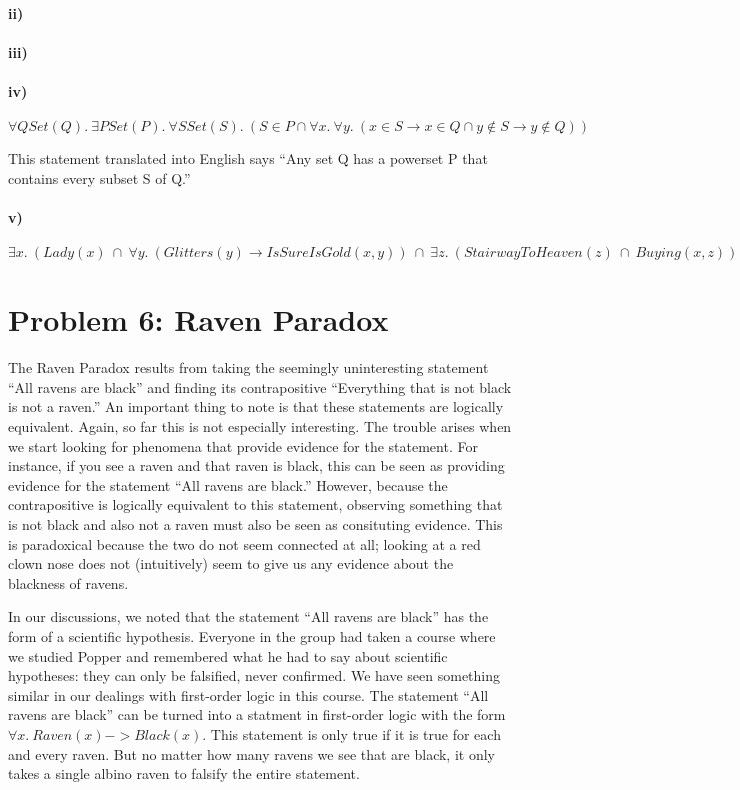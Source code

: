 \documentclass[10pt,letter]{article}
\begin{document}
\paragraph{ii)}

\paragraph{iii)}

\paragraph{iv)}
$\forall Q Set(Q) .\ \exists P Set(P) .\ \forall S Set(S) .\ (S \in P \cap \forall x .\ \forall y .\ (x \in S \rightarrow x \in Q \cap y \not \in S \rightarrow y \not \in Q))$

This statement translated into English says ``Any set Q has a powerset P that contains every subset S of Q.''
\paragraph{v)}
$\exists x .\ (Lady(x)\ \cap\ \forall y .\ (Glitters(y) \rightarrow IsSureIsGold(x, y))\ \cap\ \exists z .\ (StairwayToHeaven(z)\ \cap\ Buying(x, z)))$

\section*{Problem 6: Raven Paradox}
The Raven Paradox results from taking the seemingly uninteresting statement ``All ravens are black'' and finding its contrapositive ``Everything that is not black is not a raven.'' An important thing to note is that these statements are logically equivalent. Again, so far this is not especially interesting. The trouble arises when we start looking for phenomena that provide evidence for the statement. For instance, if you see a raven and that raven is black, this can be seen as providing evidence for the statement ``All ravens are black.'' However, because the contrapositive is logically equivalent to this statement, observing something that is not black and also not a raven must also be seen as consituting evidence. This is paradoxical because the two do not seem connected at all; looking at a red clown nose does not (intuitively) seem to give us any evidence about the blackness of ravens. 

In our discussions, we noted that the statement ``All ravens are black'' has the form of a scientific hypothesis. Everyone in the group had taken a course where we studied Popper and remembered what he had to say about scientific hypotheses: they can only be falsified, never confirmed. We have seen something similar in our dealings with first-order logic in this course. The statement ``All ravens are black'' can be turned into a statment in first-order logic with the form $\forall x .\ Raven(x) -> Black(x)$. This statement is only true if it is true for each and every raven. But no matter how many ravens we see that are black, it only takes a single albino raven to falsify the entire statement. 
\end{document}
